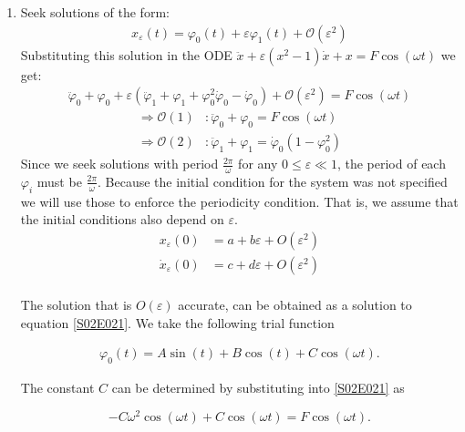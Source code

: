 \begin{solution}[2.4]
	\leavevmode
\begin{enumerate}
\item Seek solutions of the form:
\begin{align}
	x_\varepsilon(t)=\varphi_0(t)+ \varepsilon\varphi_1(t) + \mathcal{O}(\varepsilon^2)
\end{align}
Substituting this solution in the ODE $\ddot{x} + \varepsilon(x^2-1)\dot{x} + x = F\cos(\omega t)$ we get:
\begin{align}
	\ddot{\varphi}_0 + \varphi_0 + \varepsilon(\ddot{\varphi}_1 + \varphi_1 + \varphi_0^2\dot{\varphi}_0 - \dot{\varphi}_0) + \mathcal{O}(\varepsilon^2) = F\cos(\omega t)
\end{align}
\begin{align}
	\Longrightarrow \mathcal{O}(1) &: \ddot{\varphi}_0 + \varphi_0 = F\cos(\omega t) \label{S02E021} \\
	\Longrightarrow \mathcal{O}(2) &: \ddot{\varphi}_1 + \varphi_1 = \dot{\varphi}_0(1-\varphi_0^2) \label{S02E022}
\end{align}
Since we seek solutions with period $\frac{2\pi}{\omega}$ for any $0\leq \varepsilon \ll 1$, the period of each $\varphi_i$ must be $\frac{2\pi}{\omega}$.
Because the initial condition for the system was not specified we will use those to enforce the periodicity condition. That is, we assume that the initial conditions also depend on $\varepsilon$.
\begin{align}
x_\varepsilon(0) &= a + b\varepsilon + O(\varepsilon^2) \\
\dot{x}_\varepsilon(0) &= c + d\varepsilon + O(\varepsilon^2) \\
\end{align}

The solution that is $O(\varepsilon)$ accurate, can be obtained as a solution to equation \eqref{S02E021}. We take the following trial function 

\begin{align}
	\varphi_0(t) = A\sin(t) + B\cos(t) + C \cos(\omega t). \label{S02E023}
\end{align}

The constant $C$ can be determined by substituting into \ref{S02E021} as

$$
-C\omega^2 \cos(\omega t) + C\cos(\omega t) = F \cos(\omega t).
$$


\end{enumerate}
\end{solution}
